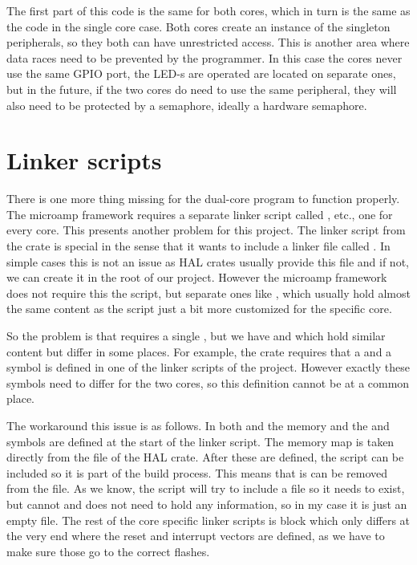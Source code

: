 The first part of this code is the same for both cores, which in turn is the same as the code in the single core case. Both cores create an instance of the singleton peripherals, so they both can have unrestricted access. This is another area where data races need to be prevented by the programmer. In this case the cores never use the same GPIO port, the LED-s are operated are located on separate ones, but in the future, if the two cores do need to use the same peripheral, they will also need to be protected by a semaphore, ideally a hardware semaphore.

\section{Linker scripts}

There is one more thing missing for the dual-core program to function properly. The microamp framework requires a separate linker script called ,  etc., one for every core. This presents another problem for this project. The  linker script from the  crate is special in the sense that it wants to include a linker file called . In simple cases this is not an issue as HAL crates usually provide this file and if not, we can create it in the root of our project. However the microamp framework does not require this the  script, but separate ones like , which usually hold almost the same content as the  script just a bit more customized for the specific core.

So the problem is that  requires a single , but we have  and  which hold similar content but differ in some places. For example, the  crate requires that a  and a  symbol is defined in one of the linker scripts of the project. However exactly these symbols need to differ for the two cores, so this definition cannot be at a common place.

The workaround this issue is as follows. In both  and  the memory and the  and  symbols are defined at the start of the linker script. The memory map is taken directly from the  file of the HAL crate. After these are defined, the  script can be included so it is part of the build process. This means that is can be removed from the  file. As we know, the  script will try to include a  file so it needs to exist, but cannot and does not need to hold any information, so in my case it is just an empty file. The rest of the core specific linker scripts is  block which only differs at the very end where the reset and interrupt vectors are defined, as we have to make sure those go to the correct flashes.

